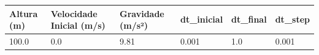 \begin{tabular}{llllll}
\toprule
Altura (m) & Velocidade Inicial (m/s) & Gravidade (m/s²) & dt\_inicial & dt\_final & dt\_step \\
\midrule
100.0 & 0.0 & 9.81 & 0.001 & 1.0 & 0.001 \\
\bottomrule
\end{tabular}
